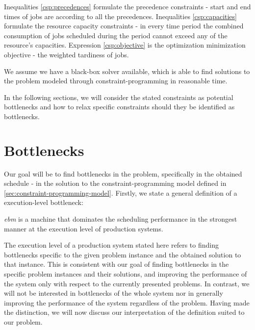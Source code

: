 Inequalities \eqref{csp:precedences} formulate the precedence constraints - start and end times of jobs
are according to all the precedences.
Inequalities \eqref{csp:capacities} formulate the resource capacity constraints - in every time period
the combined consumption of jobs scheduled during the period cannot exceed any of the resource's capacities.
Expression \eqref{csp:objective} is the optimization minimization objective - the weighted tardiness of jobs.

We assume we have a black-box solver available,
which is able to find solutions to the problem modeled through constraint-programming in reasonable time.

In the following sections, we will consider the stated constraints as potential bottlenecks
and how to relax specific constraints should they be identified as bottlenecks.

\section{Bottlenecks} \label{sec:bottlenecks}

Our goal will be to find bottlenecks in the problem, specifically in the obtained schedule
- in the solution to the constraint-programming model defined in \cref{sec:constraint-programming-model}.
Firstly, we state a general definition of a execution-level bottleneck:

\begin{defn*}\label{def:bottleneck}
    \emph{\ac{ebm}} is a machine that dominates the scheduling performance in the strongest manner
    at the execution level of production systems.
\end{defn*}

The execution level of a production system stated here refers to finding bottlenecks
specific to the given problem instance and the obtained solution to that instance.
This is consistent with our goal of finding bottlenecks in the specific problem instances and their solutions,
and improving the performance of the system only with respect to the currently presented problems.
In contrast, we will not be interested in bottlenecks of the whole system
nor in generally improving the performance of the system regardless of the problem.
Having made the distinction, we will now discuss our interpretation of the definition suited to our problem.

